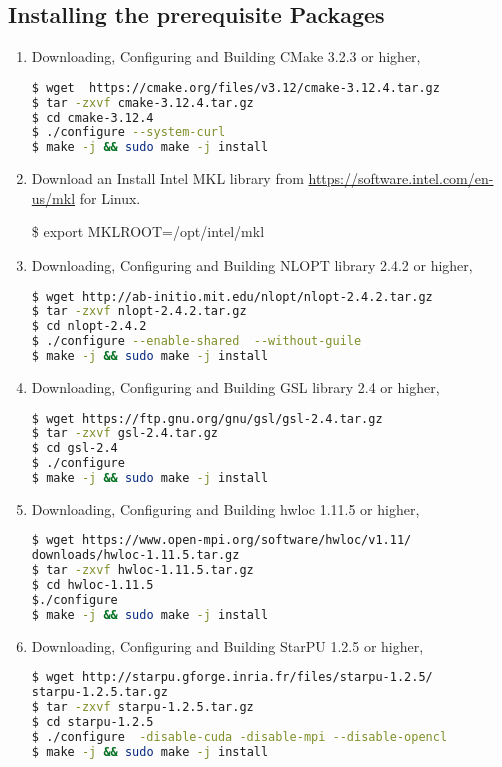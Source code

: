\documentclass[
10pt, %
a4paper, %
oneside, %
headinclude,footinclude, %
BCOR5mm, %
]{scrartcl}
\begin{document}
\subsection{Installing the prerequisite Packages}
\begin{enumerate}
\item
\noindent Downloading, Configuring and Building CMake 3.2.3 or higher,
\begin{lstlisting}[language=bash]
$ wget  https://cmake.org/files/v3.12/cmake-3.12.4.tar.gz
$ tar -zxvf cmake-3.12.4.tar.gz
$ cd cmake-3.12.4
$ ./configure --system-curl
$ make -j && sudo make -j install
\end{lstlisting}

\item

\noindent Download an Install Intel MKL library from \url{https://software.intel.com/en-us/mkl} for Linux.

\noindent \$ export MKLROOT=/opt/intel/mkl

\item
\noindent Downloading, Configuring and Building NLOPT library 2.4.2 or higher,
\begin{lstlisting}[language=bash]
$ wget http://ab-initio.mit.edu/nlopt/nlopt-2.4.2.tar.gz
$ tar -zxvf nlopt-2.4.2.tar.gz
$ cd nlopt-2.4.2
$ ./configure --enable-shared  --without-guile
$ make -j && sudo make -j install
\end{lstlisting}

\item
\noindent Downloading, Configuring and Building GSL library 2.4 or higher,
\begin{lstlisting}[language=bash]
$ wget https://ftp.gnu.org/gnu/gsl/gsl-2.4.tar.gz
$ tar -zxvf gsl-2.4.tar.gz
$ cd gsl-2.4
$ ./configure 
$ make -j && sudo make -j install
\end{lstlisting}

\item
\noindent Downloading, Configuring and Building hwloc 1.11.5 or higher,
\begin{lstlisting}[language=bash]
$ wget https://www.open-mpi.org/software/hwloc/v1.11/
downloads/hwloc-1.11.5.tar.gz
$ tar -zxvf hwloc-1.11.5.tar.gz
$ cd hwloc-1.11.5
$./configure
$ make -j && sudo make -j install
\end{lstlisting}

\item
\noindent Downloading, Configuring and Building StarPU 1.2.5 or higher,
\begin{lstlisting}[language=bash]
$ wget http://starpu.gforge.inria.fr/files/starpu-1.2.5/
starpu-1.2.5.tar.gz
$ tar -zxvf starpu-1.2.5.tar.gz
$ cd starpu-1.2.5
$ ./configure  -disable-cuda -disable-mpi --disable-opencl
$ make -j && sudo make -j install
\end{lstlisting}



\end{enumerate}
\end{document}
